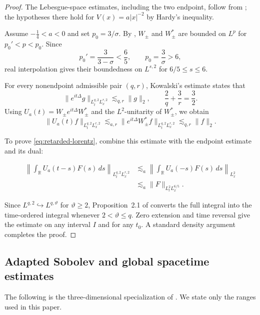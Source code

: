 \documentclass[preprint,12pt]{elsarticle}
\numberwithin{equation}{section}
\theoremstyle{definition}
\theoremstyle{remark}
\begin{document}
\begin{proof}
	The Lebesgue-space estimates, including the two endpoint, follow from
	\cite[Theorem~2.11 and Remark~2.13]{BoucletMizutani}; the hypotheses there hold for
	\(V(x)=a|x|^{-2}\) by Hardy's inequality.
	
	Assume $-\frac14<a<0$ and set $p_0=3/\sigma$. By
	\cite[Theorem~1.1]{MiaoSuZheng}, $W_\pm$ and $W_\pm^*$ are
	bounded on $L^p$ for $p_0'<p<p_0$. Since
	\[
	p_0'=\frac3{3-\sigma}<\frac65,\qquad p_0=\frac3\sigma>6,
	\]
	real interpolation gives their boundedness on $L^{s,2}$ for
	$6/5\le s\le6$.
	
	For every nonendpoint admissible pair $(q,r)$, Kowalski's estimate
	\cite[Proposition~2.8]{Kowalski} states that
	\[
	\|e^{it\Delta}g\|_{L_t^{q,2}L_x^{r,2}}
	\lesssim_{q,r}\|g\|_2,
	\qquad \frac2q+\frac3r=\frac32.
	\]
	Using $U_a(t)=W_\pm e^{it\Delta}W_\pm^*$ and the $L^2$-unitarity
	of $W_\pm^*$, we obtain
	\[
	\|U_a(t)f\|_{L_t^{q,2}L_x^{r,2}}
	\lesssim_{a,r}
	\|e^{it\Delta}W_\pm^*f\|_{L_t^{q,2}L_x^{r,2}}
	\lesssim_{q,r}\|f\|_2.
	\]
	
	To prove \eqref{eq:retarded-lorentz}, combine this estimate with the endpoint estimate and its dual:
	
	$$
	\begin{aligned}
		\left\|\int_{\mathbb R}U_a(t-s)F(s)\,ds\right\|_{L_t^{q,2}L_x^{r,2}}
		&\lesssim_a
		\left\|\int_{\mathbb R}U_a(-s)F(s)\,ds\right\|_{L_x^2}  \\
		&\lesssim_a \|F\|_{L_t^2L_x^{6/5}} .
	\end{aligned}
	$$
	
	Since \(L^{q,2}\hookrightarrow L^{q,\vartheta}\) for \(\vartheta\ge2\), Proposition~2.1 of \cite{AhnCho} converts the full integral into the time-ordered integral whenever \(2<\vartheta\le q\). Zero extension and time reversal give the estimate on any interval \(I\) and for any \(t_0\). A standard density argument completes the proof.
\end{proof}





\subsection{Adapted Sobolev and global spacetime estimates}

The following is the three-dimensional specialization of
\cite[Theorem~1.2]{KillipSobolev}. We state only the ranges used in
this paper.
\end{document}
